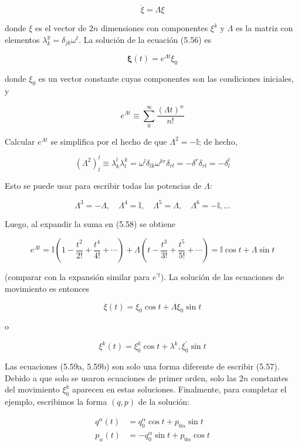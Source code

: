 \[
\dot{\xi} = \Lambda \xi \tag{5.56}
\]

donde \( \xi \) es el vector de \( 2n \) dimensiones con componentes \( \xi^{k} \) y \( \Lambda \) es la matriz con elementos \( \lambda_{k}^{y} = \delta_{j k} \omega^{t} \). La solución de la ecuación (5.56) es

\[
\boldsymbol{\xi}(t) = e^{\Lambda t} \xi_{0} \tag{5.57}
\]

donde \( \xi_{0} \) es un vector constante cuyas componentes son las condiciones iniciales, y

\[
e^{\Lambda t} \equiv \sum_{0}^{\infty} \frac{(\Lambda t)^n}{n!} \tag{5.58}
\]

Calcular \( e^{\Lambda t} \) se simplifica por el hecho de que \( \Lambda^{2} = -\mathbb{I} \); de hecho,

\[
\left( \Lambda^{2} \right)_{l}^{l} \equiv \lambda_{k}^{l} \lambda_{l}^{k} = \omega^{l} \delta_{l k} \omega^{k r} \delta_{r l} = -\delta^{r} \delta_{r l} = -\delta_{l}^{l}
\]

Esto se puede usar para escribir todas las potencias de \( \Lambda \):

\[
\Lambda^{3} = -\Lambda, \quad \Lambda^{4} = \mathbb{I}, \quad \Lambda^{5} = \Lambda, \quad \Lambda^{6} = -\mathbb{I}, \ldots
\]

Luego, al expandir la suma en (5.58) se obtiene

\[
e^{\Lambda t} = \mathbb{I} \left( 1 - \frac{t^2}{2!} + \frac{t^4}{4!} + \cdots \right) + \Lambda \left( t - \frac{t^3}{3!} + \frac{t^5}{5!} + \cdots \right)
= \mathbb{I} \cos t + \Lambda \sin t
\]

(comparar con la expansión similar para \( e^{\prime t} \)). La solución de las ecuaciones de movimiento es entonces

\[
\xi(t) = \xi_{0} \cos t + \Lambda \xi_{0} \sin t \tag{5.59a}
\]

o

\[
\xi^{k}(t) = \xi_{0}^{k} \cos t + \lambda^{k}, \xi_{0}^{\prime} \sin t \tag{5.59~b}
\]

Las ecuaciones (5.59a, 5.59b) son solo una forma diferente de escribir (5.57). Debido a que solo se usaron ecuaciones de primer orden, solo las \( 2n \) constantes del movimiento \( \xi_{0}^{k} \) aparecen en estas soluciones. Finalmente, para completar el ejemplo, escribimos la forma \((q, p)\) de la solución:

\[
\begin{aligned}
q^{\alpha}(t) &= q_{0}^{\alpha} \cos t + p_{0 \alpha} \sin t \\
p_{\alpha}(t) &= -q_{0}^{\alpha} \sin t + p_{0 \alpha} \cos t
\end{aligned}
\]

